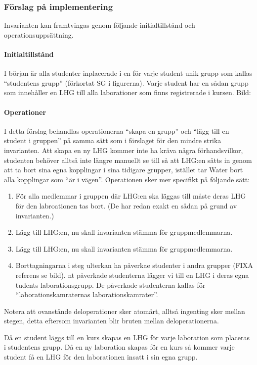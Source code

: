 \subsubsection{Förslag på implementering}
Invarianten kan  framtvingas genom följande initialtillstånd och operationsuppsättning.

\paragraph{Initialtillstånd}
I början är alla studenter inplacerade i en för varje student unik grupp som kallas “studentens grupp” (förkortat SG i figurerna). Varje student har en sådan grupp som innehåller en LHG till alla laborationer som finns registrerade i kursen. Bild:

\paragraph{Operationer}
I detta förslag behandlas operationerna “skapa en grupp” och “lägg till en student i gruppen” på samma sätt som i förslaget för den mindre strika invarianten. Att skapa en ny LHG kommer inte ha kräva några förhandsvilkor, studenten behöver alltså inte längre manuellt se till så att LHG:en sätts in genom att ta bort sina egna kopplingar i sina tidigare grupper, istället tar Water bort alla kopplingar som “är i vägen”. Operationen sker mer specifikt på följande sätt:
\begin{enumerate}
  \item För alla medlemmar i gruppen där LHG:en ska läggas till måste deras LHG för den labroationen tas bort.  (De har redan exakt en sådan på grund av invarianten.)
  \item Lägg till LHG:en, nu skall invarianten stämma för gruppmedlemmarna.
  \item Lägg till LHG:en, nu skall invarianten stämma för gruppmedlemmarna.
  \item Borttagningarna i steg ulterkan ha påverkae studenter i andra grupper (FIXA referens se bild). nt påverkade studenterna lägger vi till en LHG i deras egna  tudents laborationsgrupp. De påverkade studenterna kallas för “laborationskamraternas laborationskamrater”. 
\end{enumerate}

Notera att ovanstånde deloperationer sker atomärt, alltså ingenting sker mellan stegen, detta eftersom invarianten blir bruten mellan deloperationerna.

Då en student läggs till en kurs skapas en LHG för varje laboration som placeras i studentens grupp. Då en ny laboration skapas för en kurs så kommer varje student få en LHG för den laborationen insatt i sin egna grupp.


